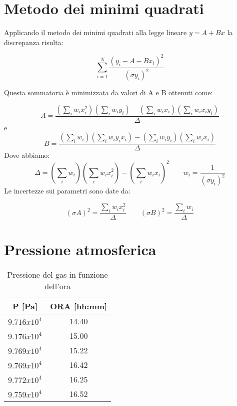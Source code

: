 \begin{appendices}

\section{Metodo dei minimi quadrati}
Applicando il metodo dei minimi quadrati alla legge lineare $ y = A + Bx$ la discrepanza risulta:

\begin{equation}
\displaystyle\sum_{i=1}^{N}\frac{(y_i -A-Bx_i)^2}{(\sigma y_i)^2}
\end{equation}
\hspace{-1.8em}

Questa sommatoria è minimizzata da valori di A e B ottenuti come:

\begin{equation}
\label{eq:a}
A = \frac{(\sum_i w_i x_i^2)(\sum_i w_i y_i)-(\sum_i w_i x_i)(\sum_i w_i x_i y_i)}{\Delta} 
\end{equation}
e
\begin{equation}
\label{eq:b}
B = \frac{(\sum_i w_i)(\sum_i w_i y_i x_i)-(\sum_i w_i y_i)(\sum_i w_i x_i)}{\Delta}
\end{equation}
Dove abbiamo:
\[ \Delta = (\sum_i w_i)(\sum_i w_i x_i^2)-(\sum_i w_i x_i)^2  \quad \quad  w_i = \frac{1}{(\sigma y_i)^2}\]
\hspace{-1.8em}
Le incertezze sui parametri sono date da:

\begin{equation} 
\label{eq:sasb}
(\sigma A)^2 = \frac{\sum_i w_i x_i^2}{\Delta}\quad \quad (\sigma B)^2 = \frac{\sum_i w_i}{\Delta}
\end{equation}

\section{Pressione atmosferica}

\begin{table}[H]
	\centering
	\begin{tabular}{|c|c|} \hline
		\textbf{P {[Pa]} } & \textbf{ORA {[hh:mm]} }  \\ \hline
		$9.716x10^4$ & 14.40  \\ \hline
		$9.176x10^4$ & 15.00  \\ \hline
		$9.769x10^4$ & 15.22  \\ \hline
		$9.769x10^4$ & 16.42  \\ \hline
		$9.772x10^4$ & 16.25  \\ \hline
		$9.759x10^4$ & 16.52  \\ \hline
	\end{tabular}
	\caption{Pressione del gas in funzione dell'ora}
\end{table}


\end{appendices}
